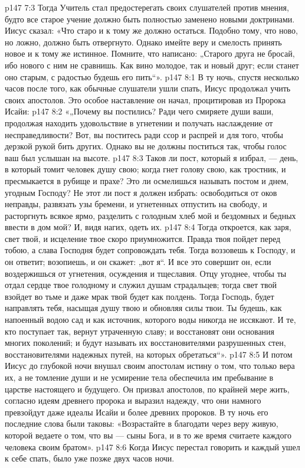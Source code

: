 \vs p147 7:3 Тогда Учитель стал предостерегать своих слушателей против мнения, будто все старое учение должно быть полностью заменено новыми доктринами. Иисус сказал: «Что старо и к тому же  должно остаться. Подобно тому, что ново, но ложно, должно быть отвергнуто. Однако имейте веру и смелость принять новое и к тому же истинное. Помните, что написано: „Старого друга не бросай, ибо нового с ним не сравнишь. Как вино молодое, так и новый друг; если станет оно старым, с радостью будешь его пить“».
\vs p147 8:1 В ту ночь, спустя несколько часов после того, как обычные слушатели ушли спать, Иисус продолжал учить своих апостолов. Это особое наставление он начал, процитировав из Пророка Исайи:
\vs p147 8:2 \pc «„Почему вы постились? Ради чего смиряете души ваши, продолжая находить удовольствие в угнетении и получать наслаждение от несправедливости? Вот, вы поститесь ради ссор и распрей и для того, чтобы дерзкой рукой бить других. Однако вы не должны поститься так, чтобы голос ваш был услышан на высоте.
\vs p147 8:3 Таков ли пост, который я избрал, --- день, в который томит человек душу свою; когда гнет голову свою, как тростник, и пресмыкается в рубище и прахе? Это ли осмелишься называть постом и днем, угодным Господу? Не этот ли пост я должен избрать: освободиться от оков неправды, развязать узы бремени, и угнетенных отпустить на свободу, и расторгнуть всякое ярмо, разделить с голодным хлеб мой и бездомных и бедных ввести в дом мой? И, видя нагих, одеть их.
\vs p147 8:4 Тогда откроется, как заря, свет твой, и исцеление твое скоро приумножится. Правда твоя пойдет перед тобою, а слава Господня будет сопровождать тебя. Тогда воззовешь к Господу, и он ответит; возопиешь, и он скажет: „вот я“. И все это совершит он, если воздержишься от угнетения, осуждения и тщеславия. Отцу угоднее, чтобы ты отдал сердце твое голодному и служил душам страдальцев; тогда свет твой взойдет во тьме и даже мрак твой будет как полдень. Тогда Господь, будет направлять тебя, насыщая душу твою и обновляя силы твои. Ты будешь, как напоенный водою сад и как источник, которого воды никогда не иссякают. И те, кто поступает так, вернут утраченную славу; и восстановят они основания многих поколений; и будут называть их восстановителями разрушенных стен, восстановителями надежных путей, на которых обретаться“».
\vs p147 8:5 \pc И потом Иисус до глубокой ночи внушал своим апостолам истину о том, что только вера их, а не томление души и не усмирение тела обеспечила им пребывание в царстве настоящего и будущего. Он призвал апостолов, по крайней мере жить, согласно идеям древнего пророка и выразил надежду, что они намного превзойдут даже идеалы Исайи и более древних пророков. В ту ночь его последние слова были таковы: «Возрастайте в благодати через веру живую, которой ведаете о том, что вы --- сыны Бога, и в то же время считаете каждого человека своим братом».
\vs p147 8:6 Когда Иисус перестал говорить и каждый ушел к себе спать, было уже позже двух часов ночи.
